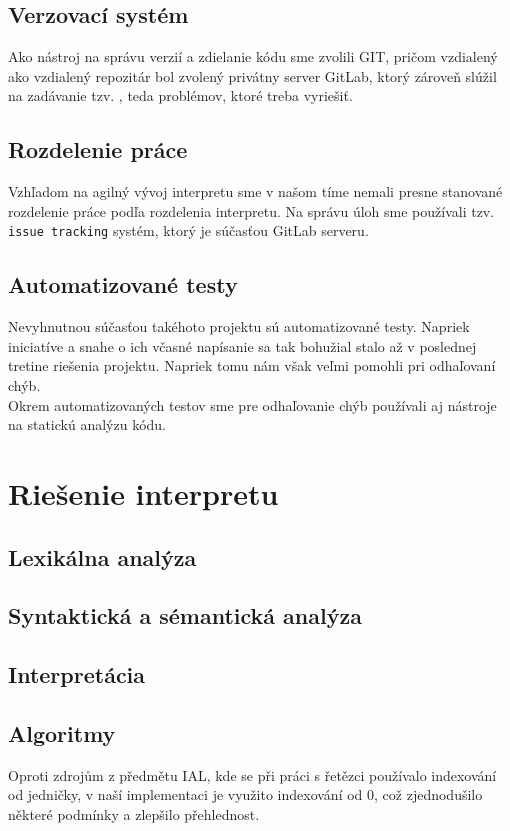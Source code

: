 \documentclass[12pt]{article}
\begin{document}
        \subsection{Verzovací systém}
			Ako nástroj na správu verzií a zdielanie kódu sme zvolili GIT, pričom vzdialený ako vzdialený repozitár bol zvolený privátny server GitLab, ktorý zároveň slúžil na zadávanie tzv. , teda problémov, ktoré treba vyriešiť.
		\subsection{Rozdelenie práce}
			Vzhľadom na agilný vývoj interpretu sme v našom tíme nemali presne stanované rozdelenie práce podľa rozdelenia interpretu. Na správu úloh sme používali tzv. \texttt{issue tracking} systém, ktorý je súčasťou GitLab serveru.
        \subsection{Automatizované testy}
	        Nevyhnutnou súčasťou takéhoto projektu sú automatizované testy. Napriek iniciatíve a snahe o ich včasné napísanie sa tak bohužial stalo až v poslednej tretine riešenia projektu. Napriek tomu nám však veľmi pomohli pri odhaľovaní chýb.\\
	        Okrem automatizovaných testov sme pre odhaľovanie chýb používali aj nástroje na statickú analýzu kódu.
	\section{Riešenie interpretu}
		\subsection{Lexikálna analýza}
		\subsection{Syntaktická a sémantická analýza}
		\subsection{Interpretácia}
		\subsection{Algoritmy}
			Oproti zdrojům z předmětu IAL, kde se při práci s řetězci používalo indexování od jedničky, v naší implementaci je využito indexování od 0, což zjednodušilo některé podmínky a zlepšilo přehlednost.
\end{document}
